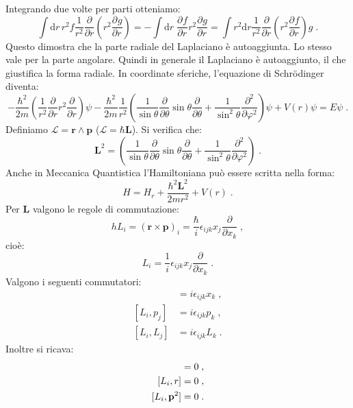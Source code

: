 \documentclass[12pt,a4paper]{report}
\theoremstyle{definition}
\newcommand{\pdev}[3][]{\frac{\partial^{#1} #2}{\partial #3^{#1}}}
\newcommand{\lag}{\mathcal{L}}
\numberwithin{equation}{section}
\newcommand{\diff}[1][]{\mathrm{d}#1}
\newcommand{\Sch}{Schrödinger}
\begin{document}
Integrando due volte per parti otteniamo:
\begin{equation}
\int\diff{r}\,r^2f\frac{1}{r^2}\frac{\partial}{\partial r}\left(r^2\pdev{g}{r}\right)=-\int\diff{r}\;\pdev{f}{r}r^2\pdev{g}{r}=\int r^2\diff{r}\frac{1}{r^2}\frac{\partial}{\partial r}\left(r^2\pdev{f}{r}\right) g\;.
\end{equation}
Questo dimostra che la parte radiale del Laplaciano è autoaggiunta. Lo stesso vale per la parte angolare. Quindi in generale il Laplaciano è autoaggiunto, il che giustifica la forma radiale. In coordinate sferiche, l'equazione di \Sch \, diventa:
\begin{equation}
-\frac{\hbar^2}{2m}\left(\frac{1}{r^2}\frac{\partial}{\partial r}r^2\frac{\partial}{\partial r}\right)\psi-
\frac{\hbar^2}{2m}\frac{1}{r^2}\left(\frac{1}{\sin\theta}\frac{\partial}{\partial\theta}\sin\theta\frac{\partial}{\partial\theta}+\frac{1}{\sin^2\theta}\frac{\partial^2}{\partial\varphi^2}\right)\psi+V(r)\psi=E\psi\;.
\end{equation}
Definiamo $\boldsymbol{\lag}=\mathbf{r}\wedge\mathbf{p}$ ($\boldsymbol{\lag}=\hbar\mathbf{L}$). Si verifica che:
\begin{equation}
\mathbf{L}^2=\left(\frac{1}{\sin\theta}\frac{\partial}{\partial\theta}\sin\theta\frac{\partial}{\partial\theta}+\frac{1}{\sin^2\theta}\frac{\partial^2}{\partial\varphi^2}\right)\;.
\end{equation}
Anche in Meccanica Quantistica l'Hamiltoniana può essere scritta nella forma:
\begin{equation}
H=H_r+\frac{\hbar^2\mathbf{L}^2}{2mr^2}+V(r)\;.
\end{equation}
Per $\mathbf{L}$ valgono le regole di commutazione:
\begin{equation*}
hL_i=(\mathbf{r}\times\mathbf{p})_i=\frac{\hbar}{i}\epsilon_{ijk}x_j\frac{\partial}{\partial x_k}\;,
\end{equation*}
cioè:
\begin{equation}
L_i=\frac{1}{i}\epsilon_{ijk}x_j\frac{\partial}{\partial x_k}\;.
\end{equation}
Valgono i seguenti commutatori:
\begin{align}
[L_i,x_j]&=i\epsilon_{ijk}x_k\;, \\
[L_i,p_j]&=i\epsilon_{ijk}p_k\;, \\
[L_i,L_j]&=i\epsilon_{ijk}L_k\;.
\end{align}
Inoltre si ricava:
\begin{align}
[L_i,\mathbf{L}^2] &= 0\;, \notag \\
[L_i,r] &= 0 \notag\;, \\
[L_i,\mathbf{p}^2]&=0\;.
\end{align}
\end{document}
